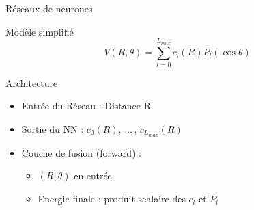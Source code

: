 \documentclass[10pt, aspectratio=169]{beamer}
\begin{document}
\begin{frame}{Réseaux de neurones}
  \begin{block}{Modèle simplifié}
    $$V(R,\theta)=\sum\limits_{l=0}^{L_{max}}c_{l}(R)P_{l}(\cos\theta)$$
  \end{block}

  \begin{exampleblock}{Architecture}
    \begin{itemize}
      \item Entrée du Réseau : Distance R
      \item Sortie du NN : $c_0(R),\,\dots\,,\,c_{L_{max}}(R)$
      \item Couche de fusion (forward) :
        \begin{itemize}
          \item $(R,\theta)$ en entrée 
          \item Energie finale : produit scalaire des $c_l$ et $P_l$
        \end{itemize}
    \end{itemize}
    
  \end{exampleblock}
  
\end{frame}
\end{document}

